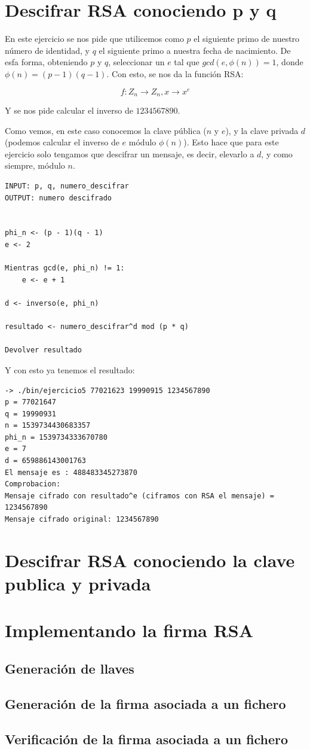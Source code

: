 \documentclass[12pt, spanish]{article}
\begin{document}
\section{Descifrar RSA conociendo p y q}

En este ejercicio se nos pide que utilicemos como $p$ el siguiente primo de nuestro número de identidad, y $q$ el siguiente primo a nuestra fecha de nacimiento. De esfa forma, obteniendo $p$ y $q$, seleccionar un $e$ tal que $gcd(e, \phi(n)) = 1$, donde $\phi(n) = (p - 1)(q - 1)$. Con esto, se nos da la función RSA:

$$
f: Z_n \rightarrow Z_n, x \rightarrow x^e
$$

Y se nos pide calcular el inverso de $1234567890$.

Como vemos, en este caso conocemos la clave pública ($n$ y $e$), y la clave privada $d$ (podemos calcular el inverso de $e$ módulo $\phi(n)$). Esto hace que para este ejercicio solo tengamos que descifrar un mensaje, es decir, elevarlo a $d$, y como siempre, módulo $n$.

\begin{lstlisting}[caption={Funcion desencriptar RSA}]
INPUT: p, q, numero_descifrar
OUTPUT: numero descifrado


phi_n <- (p - 1)(q - 1)
e <- 2

Mientras gcd(e, phi_n) != 1:
	e <- e + 1

d <- inverso(e, phi_n)

resultado <- numero_descifrar^d mod (p * q)

Devolver resultado
\end{lstlisting}

Y con esto ya tenemos el resultado:

\begin{lstlisting}
-> ./bin/ejercicio5 77021623 19990915 1234567890
p = 77021647
q = 19990931
n = 1539734430683357
phi_n = 1539734333670780
e = 7
d = 659886143001763
El mensaje es : 488483345273870
Comprobacion:
Mensaje cifrado con resultado^e (ciframos con RSA el mensaje) = 1234567890
Mensaje cifrado original: 1234567890

\end{lstlisting}


\section{Descifrar RSA conociendo la clave publica y privada}

\section{Implementando la firma RSA}

\subsection{Generación de llaves}

\subsection{Generación de la firma asociada a un fichero}

\subsection{Verificación de la firma asociada a un fichero}
\end{document}

